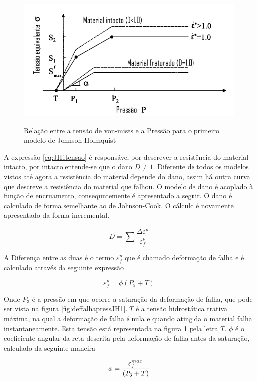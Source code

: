\begin{figure}[H] 
    \centering
    \caption{Relação entre a tensão de von-mises e a Pressão para o primeiro modelo de Johnson-Holmquist}
    \includegraphics[width = 0.7\linewidth]{images/sigmapressao.png} 
    \label{fig:JH1Tensao}
\end{figure}


A expressão \ref{eq:JH1tensao} é responsável por descrever a resistência do material intacto, por intacto entende-se que o dano $ D \neq 1 $. Diferente de todos os modelos vistos até agora a resistência do material depende do dano, assim há outra curva que descreve a resistência do material que falhou. O modelo de dano é acoplado à função de encruamento, consequntemente é apresentado a seguir. 
O dano é calculado de forma semelhante ao de Johnson-Cook. O cálculo é novamente apresentado da forma incremental. 

\begin{equation} \label{eq:danoJH}
    D = \sum \frac{\Delta \overline{\varepsilon^p} }{\varepsilon^p_f}
\end{equation}

A Diferença entre as duas é o termo $ \varepsilon^p_f $ que é chamado deformação de falha e é calculado através da seguinte expressão

\begin{equation}
    \varepsilon^p_f = \phi(P_3 + T)
\end{equation}

Onde $ P_3 $ é a pressão em que ocorre a saturação da deformação de falha, que pode ser vista na figura \ref{fig:deffalhapressJH1}. $ T $ é a tensão hidrostática trativa máxima, na qual a deformação de falha é nula e quando atingida o material falha instantaneamente. Esta tensão está representada na figura \ref{fig:JH1Tensao} pela letra $T$. $ \phi $ é o coeficiente angular da reta descrita pela deformação de falha antes da saturação, calculado da seguinte maneira

\begin{equation}
    \phi = \frac{\displaystyle \varepsilon^{max}_{f}}{\displaystyle (P_3 + T)}
\end{equation}

